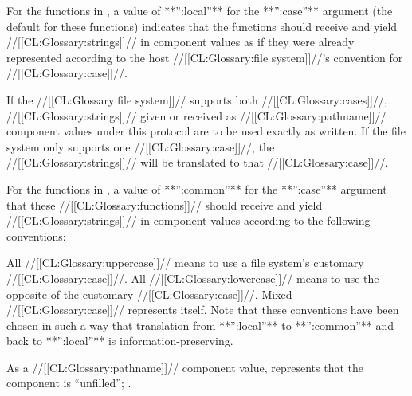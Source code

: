 
For the functions in \figref\PathnameCaseFuns, a value of **'':local''** for the **'':case''** argument  (the default for these functions) indicates that the functions should receive and yield //[[CL:Glossary:strings]]// in component values as if they were already represented according to the host //[[CL:Glossary:file system]]//'s  convention for //[[CL:Glossary:case]]//.

If the //[[CL:Glossary:file system]]// supports both //[[CL:Glossary:cases]]//, //[[CL:Glossary:strings]]// given or received as //[[CL:Glossary:pathname]]// component values under this protocol are to be used exactly as written.  If the file system only supports one //[[CL:Glossary:case]]//,  the //[[CL:Glossary:strings]]// will be translated to that //[[CL:Glossary:case]]//.

\endsubsubsubsubsection%


For the functions in \figref\PathnameCaseFuns, a value of **'':common''** for the **'':case''** argument  that these //[[CL:Glossary:functions]]// should receive  and yield //[[CL:Glossary:strings]]// in component values according to the following conventions:

\beginlist \itemitem{\bull} All //[[CL:Glossary:uppercase]]// means to use a file system's customary //[[CL:Glossary:case]]//. \itemitem{\bull} All //[[CL:Glossary:lowercase]]// means to use the opposite of the customary //[[CL:Glossary:case]]//. \itemitem{\bull} Mixed //[[CL:Glossary:case]]// represents itself. \endlist Note that these conventions have been chosen in such a way that translation from **'':local''** to **'':common''** and back to **'':local''** is information-preserving.
  \endsubsubsubsubsection%

\endsubsubsubsection%

\endsubsubsection%

 


As a //[[CL:Glossary:pathname]]// component value, \nil represents that the component is ``unfilled''; \seesection\MergingPathnames.

